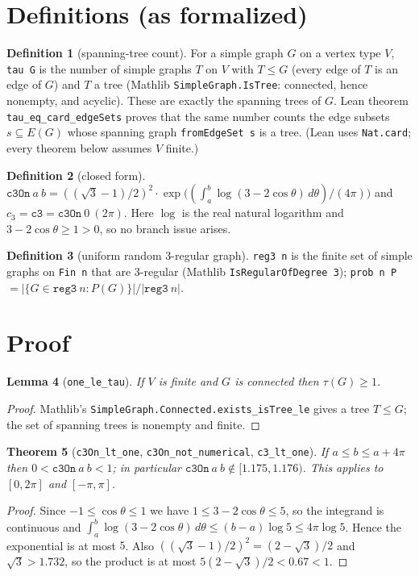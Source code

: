 \documentclass[11pt]{article}
\newtheorem{theorem}{Theorem}
\newtheorem{lemma}[theorem]{Lemma}
\theoremstyle{definition}
\newtheorem{definition}[theorem]{Definition}
\begin{document}
\section{Definitions (as formalized)}

\begin{definition}[spanning-tree count]
For a simple graph $G$ on a vertex type $V$, \texttt{tau G} is the number of simple graphs $T$ on
$V$ with $T\le G$ (every edge of $T$ is an edge of $G$) and $T$ a tree (Mathlib
\texttt{SimpleGraph.IsTree}: connected, hence nonempty, and acyclic). These are exactly the
spanning trees of $G$. Lean theorem \texttt{tau\_eq\_card\_edgeSets} proves that the same number
counts the edge subsets $s\subseteq E(G)$ whose spanning graph \texttt{fromEdgeSet s} is a tree.
(Lean uses \texttt{Nat.card}; every theorem below assumes $V$ finite.)
\end{definition}

\begin{definition}[closed form]
$\mathtt{c3On}\ a\ b=((\sqrt3-1)/2)^2\cdot\exp\big((\int_a^b\log(3-2\cos\theta)\,d\theta)/(4\pi)\big)$
and $c_3=\mathtt{c3}=\mathtt{c3On}\ 0\ (2\pi)$. Here $\log$ is the real natural logarithm and
$3-2\cos\theta\ge1>0$, so no branch issue arises.
\end{definition}

\begin{definition}[uniform random 3-regular graph]
\texttt{reg3 n} is the finite set of simple graphs on \texttt{Fin n} that are 3-regular (Mathlib
\texttt{IsRegularOfDegree 3}); \texttt{prob n P} $=|\{G\in\mathtt{reg3}\ n: P(G)\}|/|\mathtt{reg3}\ n|$.
\end{definition}

\section{Proof}

\begin{lemma}[\texttt{one\_le\_tau}]
If $V$ is finite and $G$ is connected then $\tau(G)\ge1$.
\end{lemma}
\begin{proof}
Mathlib's \texttt{SimpleGraph.Connected.exists\_isTree\_le} gives a tree $T\le G$; the set of
spanning trees is nonempty and finite.
\end{proof}

\begin{theorem}[\texttt{c3On\_lt\_one}, \texttt{c3On\_not\_numerical}, \texttt{c3\_lt\_one}]
If $a\le b\le a+4\pi$ then $0<\mathtt{c3On}\ a\ b<1$; in particular
$\mathtt{c3On}\ a\ b\notin[1.175,1.176)$. This applies to $[0,2\pi]$ and $[-\pi,\pi]$.
\end{theorem}
\begin{proof}
Since $-1\le\cos\theta\le1$ we have $1\le3-2\cos\theta\le5$, so the integrand is continuous and
$\int_a^b\log(3-2\cos\theta)\,d\theta\le(b-a)\log5\le4\pi\log5$. Hence the exponential is at most
$5$. Also $((\sqrt3-1)/2)^2=(2-\sqrt3)/2$ and $\sqrt3>1.732$, so the product is at most
$5(2-\sqrt3)/2<0.67<1$.
\end{proof}
\end{document}
